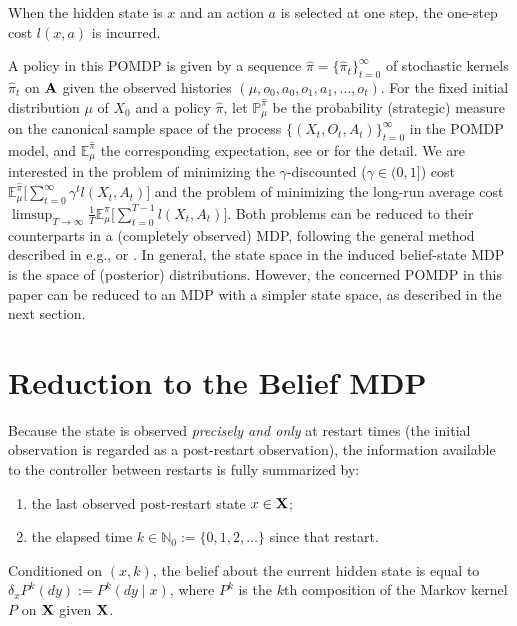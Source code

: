 \documentclass[letterpaper,10pt,conference]{ieeeconf}  %
\newtheorem{assumption}{Assumption}
\begin{document}
When the hidden state is $x$ and an action $a$ is selected at one step, the one-step cost $l(x,a)$
is incurred.

 A policy in this POMDP is given by a sequence $\hat{\pi}=\{\hat{\pi}_t\}_{t=0}^\infty$ of stochastic kernels $\hat{\pi}_t$ on ${\bf A}$ given the observed histories $(\mu,o_0,a_0,o_1,a_1,\dots,o_t).$ For the fixed initial distribution $\mu$ of $X_0$ and a policy $\hat{\pi}$, let $\mathbb{P}_\mu^{\hat{\pi}}$ be the probability (strategic) measure on the canonical sample space of the process $\{(X_t,O_t,A_t)\}_{t=0}^\infty$ in the POMDP model, and $\mathbb{E}_\mu^{\hat{\pi}}$ the corresponding expectation, see \cite[Chapter 4]{O89} or \cite{Feinberg:2012} for the detail.  We are interested in the problem of minimizing the $\gamma$-discounted ($\gamma\in(0,1]$) cost
$\mathbb{E}_\mu^{\hat{\pi}}\Big[\sum_{t=0}^\infty \gamma^t l(X_t,A_t) \Big]$
and the problem of minimizing the long-run average cost
$\limsup_{T\rightarrow \infty}\frac{1}{T}\mathbb{E}_\mu^{\hat{\pi}}\Big[\sum_{t=0}^{T-1} l(X_t,A_t) \Big].$ 
Both problems can be reduced to their counterparts in a (completely observed) MDP, following the general method described in e.g., \cite{Feinberg:2012} or \cite[Chapter 4]{O89}. In general, the state space in the induced belief-state MDP is the space of  (posterior) distributions.  However, the concerned POMDP in this paper can be reduced to an MDP with a simpler state space, as described in the next section.
 




\section{Reduction to the Belief MDP}

Because the state is observed \emph{precisely and only} at restart times (the initial observation is regarded as a post-restart observation), 
the information available to the controller between restarts
is fully summarized by:
\begin{enumerate}
\item the last observed post-restart state $x\in {\bf X}$;
\item the elapsed time $k\in\mathbb N_0:=\{0,1,2,\dots\}$ since that restart.
\end{enumerate}
Conditioned on $(x,k)$, the belief about the current hidden state is equal to $\delta_x P^k{(dy):=P^k(dy\mid x)}$, {where $P^k$ is the $k$th composition of the Markov kernel $P$ on ${\bf X}$ given ${\bf X}$.} 
\end{document}
